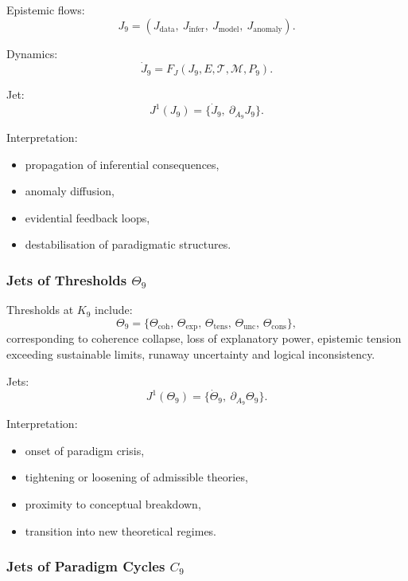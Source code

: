 Epistemic flows:
\[
J_9=
(J_{\mathrm{data}},\
 J_{\mathrm{infer}},\
 J_{\mathrm{model}},\
 J_{\mathrm{anomaly}}).
\]

Dynamics:
\[
\dot{J}_9 =
F_J(J_9,E,\mathcal{T},\mathcal{M},P_9).
\]

Jet:
\[
J^1(J_9)=\{\dot{J}_9,\ \partial_{A_9}J_9\}.
\]

Interpretation:
\begin{itemize}
    \item propagation of inferential consequences,
    \item anomaly diffusion,
    \item evidential feedback loops,
    \item destabilisation of paradigmatic structures.
\end{itemize}


\subsubsection{Jets of Thresholds \texorpdfstring{$\Theta_9$}{\Theta_9}}

Thresholds at $K_9$ include:
\[
\Theta_9 =
\{
\Theta_{\mathrm{coh}},\,
\Theta_{\mathrm{exp}},\,
\Theta_{\mathrm{tens}},\,
\Theta_{\mathrm{unc}},\,
\Theta_{\mathrm{cons}}
\},
\]
corresponding to coherence collapse, loss of explanatory power,
epistemic tension exceeding sustainable limits, runaway uncertainty and
logical inconsistency.

Jets:
\[
J^1(\Theta_9)=\{\dot{\Theta}_9,\ \partial_{A_9}\Theta_9\}.
\]

Interpretation:
\begin{itemize}
    \item onset of paradigm crisis,
    \item tightening or loosening of admissible theories,
    \item proximity to conceptual breakdown,
    \item transition into new theoretical regimes.
\end{itemize}


\subsubsection{Jets of Paradigm Cycles \texorpdfstring{$C_9$}{C_9}}

